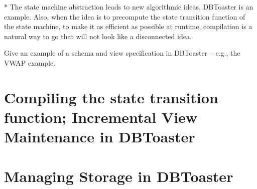 \documentclass{sig-alternate}
\begin{document}
* The state machine abstraction leads to new algorithmic ideas. DBToaster is an example. Also, when the idea is to precompute the state transition function of the state machine, to make it as efficient as possible at runtime, compilation is a natural way to go that will not look like a disconnected idea.




Give an example of a schema and view specification in DBToaster -- e.g., the VWAP example.






\section{Compiling the state transition function; Incremental View Maintenance in DBToaster}



\section{Managing Storage in DBToaster}

\end{document}
